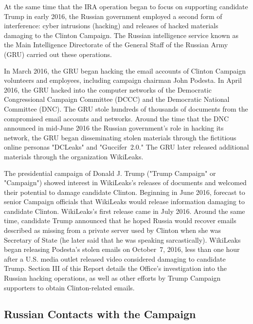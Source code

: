At the same time that the IRA operation began to focus on supporting candidate Trump in early 2016, the Russian government employed a second form of interference: cyber intrusions (hacking) and releases of hacked materials damaging to the Clinton Campaign.
The Russian intelligence service known as the Main Intelligence Directorate of the General Staff of the Russian Army (GRU) carried out these operations.

In March 2016, the GRU began hacking the email accounts of Clinton Campaign volunteers and employees, including campaign chairman John Podesta.
In April 2016, the GRU hacked into the computer networks of the Democratic Congressional Campaign Committee (DCCC) and the Democratic National Committee (DNC).
The GRU stole hundreds of thousands of documents from the compromised email accounts and networks.
Around the time that the DNC announced in mid-June 2016 the Russian government's role in hacking its network, the GRU began disseminating stolen materials through the fictitious online personas "DCLeaks" and "Guccifer~2.0."
The GRU later released additional materials through the organization WikiLeaks.

The presidential campaign of Donald J. Trump ("Trump Campaign" or "Campaign") showed interest in WikiLeaks's releases of documents and welcomed their potential to damage candidate Clinton. Beginning in June 2016,  forecast to senior Campaign officials that WikiLeaks would release information damaging to candidate Clinton.
WikiLeaks's first release came in July 2016.
Around the same time, candidate Trump announced that he hoped Russia would recover emails described as missing from a private server used by Clinton when she was Secretary of State (he later said that he was speaking sarcastically).
 WikiLeaks began releasing Podesta's stolen emails on October~7, 2016, less than one hour after a U.S. media outlet released video considered damaging to candidate Trump.
Section III of this Report details the Office's investigation into the Russian hacking operations, as well as other efforts by Trump Campaign supporters to obtain Clinton-related emails.

\subsection*{Russian Contacts with the Campaign}

